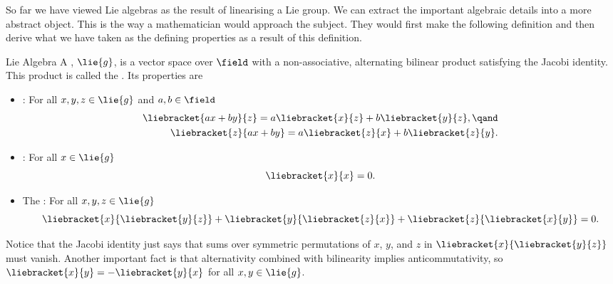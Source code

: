 \documentclass[fleqn]{NotesClass}
\begin{document}
    So far we have viewed Lie algebras as the result of linearising a Lie group.
    We can extract the important algebraic details into a more abstract object.
    This is the way a mathematician would approach the subject.
    They would first make the following definition and then derive what we have taken as the defining properties as a result of this definition.
    \begin{dfn}{Lie Algebra}{}
        A , \(\lie{g}\), is a vector space over \(\field\) with a non-associative, alternating bilinear product satisfying the Jacobi identity.
        This product is called the .
        Its properties are
        \begin{itemize}
            \item {}: For all \(x, y, z \in \lie{g}\) and \(a, b \in \field\)
            \begin{align}
                \liebracket{ax + by}{z} = a\liebracket{x}{z} + b\liebracket{y}{z}, \qand\\
                \liebracket{z}{ax + by} = a\liebracket{z}{x} + b\liebracket{z}{y}.
            \end{align}
            \item {}: For all \(x \in \lie{g}\)
            \begin{equation}
                \liebracket{x}{x} = 0.
            \end{equation}
            \item The : For all \(x, y, z \in \lie{g}\)
            \begin{equation}
                \liebracket{x}{\liebracket{y}{z}} + \liebracket{y}{\liebracket{z}{x}} + \liebracket{z}{\liebracket{x}{y}} = 0.
            \end{equation}
        \end{itemize}
    \end{dfn}
    Notice that the Jacobi identity just says that sums over symmetric permutations of \(x\), \(y\), and \(z\) in \(\liebracket{x}{\liebracket{y}{z}}\) must vanish.
    Another important fact is that alternativity combined with bilinearity implies anticommutativity, so \(\liebracket{x}{y} = -\liebracket{y}{x}\) for all \(x, y \in \lie{g}\).
    
\end{document}

